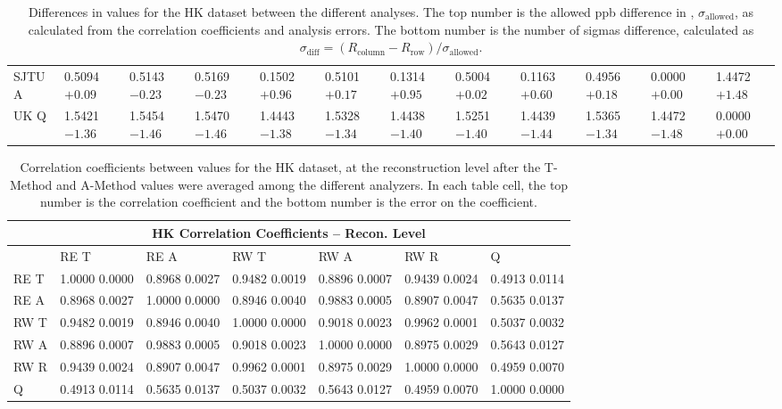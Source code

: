 \begin{landscape}
\begin{table}
\begin{tabularx}{1\linewidth}{@{\extracolsep{\fill}}lXXXXXXXXXXX}
	SJTU A & 0.5094 $+0.09$ & 0.5143 $-0.23$ & 0.5169 $-0.23$ & 0.1502 $+0.96$ & 0.5101 $+0.17$ & 0.1314 $+0.95$ & 0.5004 $+0.02$ & 0.1163 $+0.60$ & 0.4956 $+0.18$ & 0.0000 $+0.00$ & 1.4472 $+1.48$  \\
	UK Q   & 1.5421 $-1.36$ & 1.5454 $-1.46$ & 1.5470 $-1.46$ & 1.4443 $-1.38$ & 1.5328 $-1.34$ & 1.4438 $-1.40$ & 1.5251 $-1.40$ & 1.4439 $-1.44$ & 1.5365 $-1.34$ & 1.4472 $-1.48$ & 0.0000 $+0.00$  \\
  \bottomrule
\end{tabularx}
\caption[]{Differences in \R values for the HK dataset between the different analyses. The top number is the allowed ppb difference in \R, $\sigma_{\text{allowed}}$, as calculated from the correlation coefficients and analysis errors. The bottom number is the number of sigmas difference, calculated as $\sigma_{\text{diff}} = (R_{\text{column}}-R_{\text{row}})/\sigma_{\text{allowed}}$.}
\label{tab:HK_diff}
\end{table}
\end{landscape}


\begin{table}
\setlength\tabcolsep{15pt}
\small
\centering
\renewcommand{\arraystretch}{1.4}
\begin{tabularx}{0.8\linewidth}{@{\extracolsep{\fill}}lXXXXXX}
  \toprule
  	\multicolumn{7}{c}{{\normalsize HK Correlation Coefficients -- Recon. Level}} \\
  \midrule
  	       & RE T & RE A & RW T & RW A & RW R & \quad Q \\
  \midrule
	RE T   & 1.0000 0.0000 & 0.8968 0.0027 & 0.9482 0.0019 & 0.8896 0.0007 & 0.9439 0.0024 & 0.4913 0.0114  \\
	RE A   & 0.8968 0.0027 & 1.0000 0.0000 & 0.8946 0.0040 & 0.9883 0.0005 & 0.8907 0.0047 & 0.5635 0.0137  \\
	RW T   & 0.9482 0.0019 & 0.8946 0.0040 & 1.0000 0.0000 & 0.9018 0.0023 & 0.9962 0.0001 & 0.5037 0.0032  \\
	RW A   & 0.8896 0.0007 & 0.9883 0.0005 & 0.9018 0.0023 & 1.0000 0.0000 & 0.8975 0.0029 & 0.5643 0.0127  \\
	RW R   & 0.9439 0.0024 & 0.8907 0.0047 & 0.9962 0.0001 & 0.8975 0.0029 & 1.0000 0.0000 & 0.4959 0.0070  \\
	Q      & 0.4913 0.0114 & 0.5635 0.0137 & 0.5037 0.0032 & 0.5643 0.0127 & 0.4959 0.0070 & 1.0000 0.0000  \\
  \bottomrule
\end{tabularx}
\caption[]{Correlation coefficients between \R values for the HK dataset, at the reconstruction level after the \RW T-Method and A-Method \R values were averaged among the different analyzers. In each table cell, the top number is the correlation coefficient and the bottom number is the error on the coefficient.}
\label{tab:Corrs_HK_recon}
\end{table}



